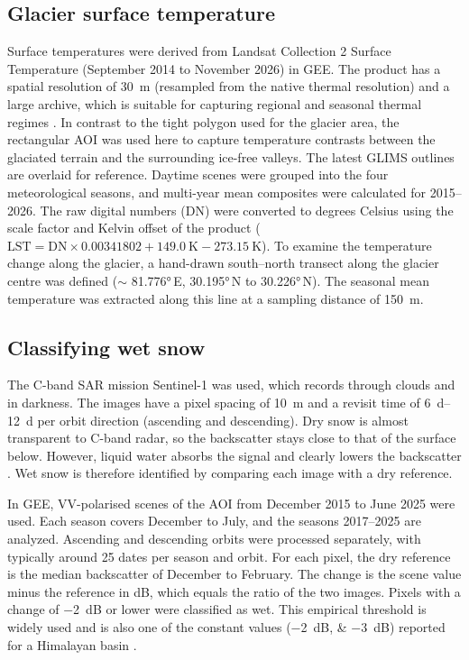 \documentclass{article}
\begin{document}
\subsection{Glacier surface temperature}
Surface temperatures were derived from Landsat Collection 2 Surface Temperature (September 2014 to November 2026) in GEE. The product has a spatial resolution of \qty{30}{\m} (resampled from the native thermal resolution) and a large archive, which is suitable for capturing regional and seasonal thermal regimes \citep{earth_resources_observation_and_science_eros_center_landsat_2020}. In contrast to the tight polygon used for the glacier area, the rectangular AOI was used here to capture temperature contrasts between the glaciated terrain and the surrounding ice-free valleys. The latest GLIMS outlines are overlaid for reference. Daytime scenes were grouped into the four meteorological seasons, and multi-year mean composites were calculated for \numrange{2015}{2026}. The raw digital numbers (DN) were converted to degrees Celsius using the scale factor and Kelvin offset of the product ($\mathrm{LST} = \mathrm{DN} \times \num{0.00341802} + \qty{149.0}{\kelvin} - \qty{273.15}{\kelvin}$). To examine the temperature change along the glacier, a hand-drawn south--north transect along the glacier centre was defined ($\sim$ \ang{81.776}\,E, \ang{30.195}\,N to \ang{30.226}\,N). The seasonal mean temperature was extracted along this line at a sampling distance of \qty{150}{\m}.

\subsection{Classifying wet snow}
The C-band SAR mission Sentinel-1 was used, which records through clouds and in darkness. The images have a pixel spacing of \qty{10}{\m} and a revisit time of \qtyrange{6}{12}{\day} per orbit direction (ascending and descending). Dry snow is almost transparent to C-band radar, so the backscatter stays close to that of the surface below. However, liquid water absorbs the signal and clearly lowers the backscatter \citep{nagler_retrieval_2000}. Wet snow is therefore identified by comparing each image with a dry reference.

In GEE, VV-polarised scenes of the AOI from December 2015 to June 2025 were used. Each season covers December to July, and the seasons \numrange{2017}{2025} are analyzed. Ascending and descending orbits were processed separately, with typically around \num{25} dates per season and orbit. For each pixel, the dry reference is the median backscatter of December to February. The change is the scene value minus the reference in \unit{\dB}, which equals the ratio of the two images. Pixels with a change of \qty{-2}{\dB} or lower were classified as wet. This empirical threshold is widely used \citep{nagler_advancements_2016, lund_interpreting_2022} and is also one of the constant values (\qtylist{-2;-3}{\dB}) reported for a Himalayan basin \citep{snapir_method_2019}.
\end{document}
